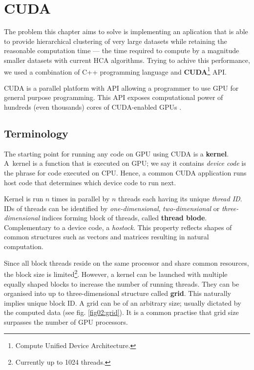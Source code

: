 \chapter{CUDA}

The problem this chapter aims to solve is implementing an aplication that is able to provide hierarchical clustering of very large datasets while retaining the reasonable computation time --- the time required to compute by a magnitude smaller datasets with current HCA algorithms.
Trying to achive this performance, we used a combination of C++ programming language and \textbf{CUDA}\footnote{Compute Unified Device Architecture.} API.

CUDA is a parallel platform with API allowing a programmer to use GPU for general purpose programming. This API exposes computational power of hundreds (even thousands) cores of CUDA-enabled GPUs \cite{cuda}.


\section{Terminology}

The starting point for running any code on GPU using CUDA is a \textbf{kernel}. A~kernel is a function that is executed on GPU; we say it contains \emph{device code} is the phrase for code executed on CPU. Hence, a common CUDA application runs host code that determines which device code to run next. 

Kernel is run $n$ times in parallel by $n$ threads each having its unique \emph{thread ID}. IDs of threads can be identified by \emph{one-dimensional}, \emph{two-dimensional} or \emph{three-dimensional} indices forming block of threads, called \textbf{thread blode}. Complementary to a device code, a \emph{hostock}. This property reflects shapes of common structures such as vectors and matrices resulting in natural computation.

Since all block threads reside on the same processor and share common resources, the block size is limited\footnote{Currently up to 1024 threads.}. However, a kernel can be launched with multiple equally shaped blocks to increase the number of running threads. They can be organised into up to three-dimensional structure called \textbf{grid}. This naturally implies unique block ID. A grid can be of an arbitrary size; usually dictated by the computed data (see fig. \ref{fig02:grid}). It is a common practise that grid size surpasses the number of GPU processors.


